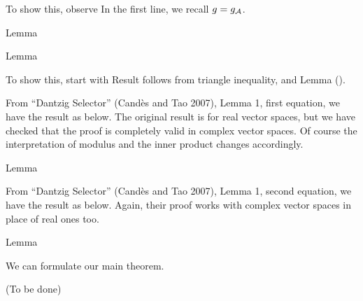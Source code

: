 To show this, observe
%
%
In the first line, we recall \(g =g_{\mathcal{A}}\).

\Result
{Lemma}
{
%
%
}

\Result
{Lemma}
{
%
%
}

To show this, start with
%
%
Result follows from triangle inequality, and Lemma ().

From ``Dantzig Selector'' (Cand\`es and Tao 2007), Lemma 1, first equation, we have the result as below.
The original result is for real vector spaces, but we have checked that the proof is completely valid in complex vector spaces.
Of course the interpretation of modulus and the inner product changes accordingly.

\Result
{Lemma}
{
%
%
}

From ``Dantzig Selector'' (Cand\`es and Tao 2007), Lemma 1, second equation, we have the result as below.
Again, their proof works with complex vector spaces in place of real ones too.

\Result
{Lemma}
{
%
%
}

We can formulate our main theorem.

{ \color{red} (To be done) }
